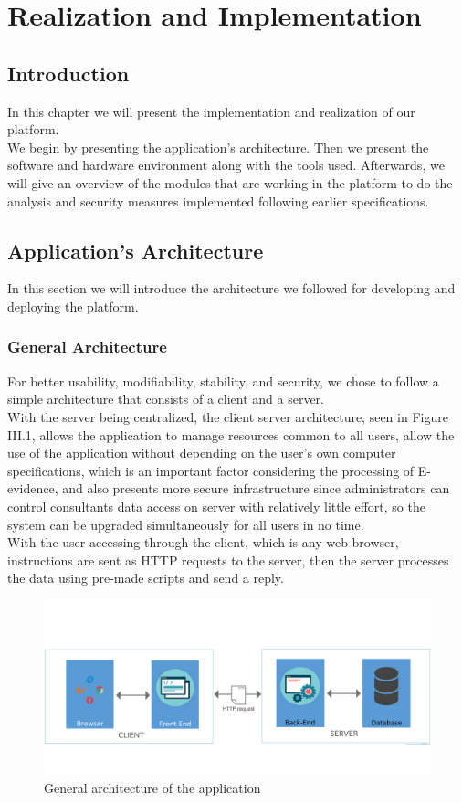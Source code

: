 \renewcommand\thechapter{\Roman{chapter}}
\chapter{Realization and Implementation}
\newpage
{}

\section*{Introduction}
In this chapter we will present the implementation and realization of our platform.\\We begin by presenting the application's architecture. Then we present the software and hardware environment along with the tools used. Afterwards, we will give an overview of the modules that are working in the platform to do the analysis and security measures implemented following earlier specifications.


\section{Application’s Architecture}
In this section we will introduce the architecture we followed for developing and deploying the platform.
\subsection{General Architecture}
For better usability, modifiability, stability, and security, we chose to follow a simple architecture that consists of a client and a server.\\With the server being centralized, the client server architecture, seen in Figure III.1, allows the application to manage resources common to all users, allow the use of the application without depending on the user's own computer specifications, which is an important factor considering the processing of E-evidence, and also presents more secure infrastructure since administrators can control consultants data access on server with relatively little effort, so the system can be upgraded simultaneously for all users in no time.\\With the user accessing through the client, which is any web browser, instructions are sent as HTTP requests to the server, then the server processes the data using pre-made scripts and send a reply.
\begin{figure}[H]
\centering
\includegraphics[width=1\columnwidth]{Figures/genarchitecture.png}
\caption{General architecture of the application}
\end{figure}

